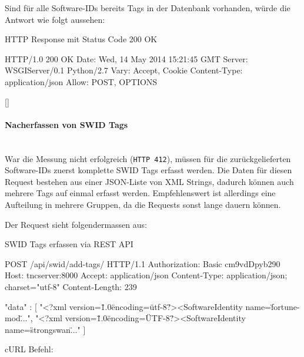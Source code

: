 Sind für alle Software-IDs bereits Tags in der Datenbank vorhanden, würde die
Antwort wie folgt aussehen:

\begin{listing}
\caption{HTTP Response mit Status Code 200 OK}
\begin{httpcode}
HTTP/1.0 200 OK
Date: Wed, 14 May 2014 15:21:45 GMT
Server: WSGIServer/0.1 Python/2.7
Vary: Accept, Cookie
Content-Type: application/json
Allow: POST, OPTIONS

[]
\end{httpcode}
\end{listing}

\paragraph{Nacherfassen von SWID Tags}\hspace{0pt} \\
War die Messung nicht erfolgreich (\texttt{HTTP 412}), müssen für die
zurückgelieferten Software-IDs zuerst komplette SWID Tags erfasst werden. Die
Daten für diesen Request bestehen aus einer JSON-Liste von XML Strings, dadurch
können auch mehrere Tags auf einmal erfasst werden. Empfehlenswert ist
allerdings eine Aufteilung in mehrere Gruppen, da die Requests sonst lange
dauern können.

Der Request sieht folgendermassen aus:

\begin{listing}
\caption{SWID Tags erfassen via REST API}
\begin{httpcode}
POST /api/swid/add-tags/ HTTP/1.1
Authorization: Basic cm9vdDpyb290
Host: tncserver:8000
Accept: application/json
Content-Type: application/json; charset="utf-8"
Content-Length: 239

{ "data" : 
	[
		"<?xml version=\"1.0\" encoding=\"utf-8\"?><SoftwareIdentity name=\"fortune-mod\"...",
		"<?xml version=\"1.0\" encoding=\"UTF-8\"?><SoftwareIdentity name=\"strongswan\"..."
	]
}

\end{httpcode}
\end{listing}

cURL Befehl:


